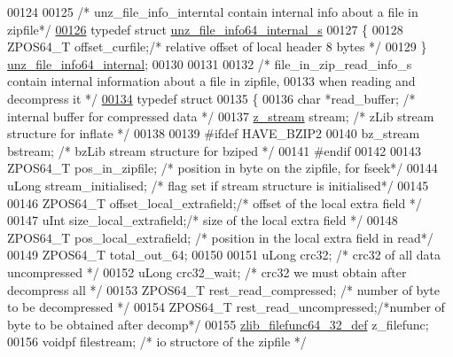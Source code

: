 \begin{DoxyCode}
00124 
00125 \textcolor{comment}{/* unz\_file\_info\_interntal contain internal info about a file in zipfile*/}
\hyperlink{structunz__file__info64__internal__s}{00126} \textcolor{keyword}{typedef} \textcolor{keyword}{struct }\hyperlink{structunz__file__info64__internal__s}{unz\_file\_info64\_internal\_s}
00127 \{
00128     ZPOS64\_T offset\_curfile;\textcolor{comment}{/* relative offset of local header 8 bytes */}
00129 \} \hyperlink{structunz__file__info64__internal__s}{unz\_file\_info64\_internal};
00130 
00131 
00132 \textcolor{comment}{/* file\_in\_zip\_read\_info\_s contain internal information about a file in zipfile,}
00133 \textcolor{comment}{    when reading and decompress it */}
\hyperlink{structfile__in__zip64__read__info__s}{00134} \textcolor{keyword}{typedef} \textcolor{keyword}{struct}
00135 \{
00136     \textcolor{keywordtype}{char}  *read\_buffer;         \textcolor{comment}{/* internal buffer for compressed data */}
00137     \hyperlink{structz__stream__s}{z\_stream} stream;            \textcolor{comment}{/* zLib stream structure for inflate */}
00138 
00139 \textcolor{preprocessor}{#ifdef HAVE\_BZIP2}
00140     bz\_stream bstream;          \textcolor{comment}{/* bzLib stream structure for bziped */}
00141 \textcolor{preprocessor}{#endif}
00142 
00143     ZPOS64\_T pos\_in\_zipfile;       \textcolor{comment}{/* position in byte on the zipfile, for fseek*/}
00144     uLong stream\_initialised;   \textcolor{comment}{/* flag set if stream structure is initialised*/}
00145 
00146     ZPOS64\_T offset\_local\_extrafield;\textcolor{comment}{/* offset of the local extra field */}
00147     uInt  size\_local\_extrafield;\textcolor{comment}{/* size of the local extra field */}
00148     ZPOS64\_T pos\_local\_extrafield;   \textcolor{comment}{/* position in the local extra field in read*/}
00149     ZPOS64\_T total\_out\_64;
00150 
00151     uLong crc32;                \textcolor{comment}{/* crc32 of all data uncompressed */}
00152     uLong crc32\_wait;           \textcolor{comment}{/* crc32 we must obtain after decompress all */}
00153     ZPOS64\_T rest\_read\_compressed; \textcolor{comment}{/* number of byte to be decompressed */}
00154     ZPOS64\_T rest\_read\_uncompressed;\textcolor{comment}{/*number of byte to be obtained after decomp*/}
00155     \hyperlink{structzlib__filefunc64__32__def__s}{zlib\_filefunc64\_32\_def} z\_filefunc;
00156     voidpf filestream;        \textcolor{comment}{/* io structore of the zipfile */}

\end{DoxyCode}
